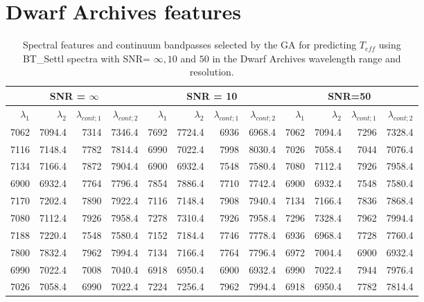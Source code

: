 \section{Dwarf Archives features}
\label{app:features:ipac}


\begin{table*}
\begin{center}
\begin{tabular}{rrrr | rrrr | rrrr }
  \hline
 \multicolumn{4}{c}{SNR = $\infty $} &  \multicolumn{4}{c}{SNR = 10} &  \multicolumn{4}{c}{SNR=50} \\
  \hline
$\lambda_1$ & $\lambda_2$ & $\lambda_{cont;1}$ & $\lambda_{cont;2} $ & $\lambda_1$ & $\lambda_2$ & $\lambda_{cont;1}$ & $\lambda_{cont;2} $ & $\lambda_1$ & $\lambda_2$ & $\lambda_{cont;1}$ & $\lambda_{cont;2} $ \\ 
  \hline
7062 & 7094.4 &	7314 & 7346.4 & 7692 & 7724.4 &	6936 & 6968.4  & 7062 & 7094.4 &  7296 & 7328.4 \\
7116 & 7148.4 &	7782 & 7814.4 & 6990 & 7022.4 &	7998 & 8030.4  & 7026 & 7058.4 &  7044 & 7076.4 \\
7134 & 7166.4 &	7872 & 7904.4 & 6900 & 6932.4 &	7548 & 7580.4  & 7080 & 7112.4 &  7926 & 7958.4 \\
6900 & 6932.4 &	7764 & 7796.4 & 7854 & 7886.4 &	7710 & 7742.4  & 6900 & 6932.4 &  7548 & 7580.4 \\
7170 & 7202.4 &	7890 & 7922.4 & 7116 & 7148.4 &	7908 & 7940.4  & 7134 & 7166.4 &  7836 & 7868.4 \\
7080 & 7112.4 &	7926 & 7958.4 & 7278 & 7310.4 &	7926 & 7958.4  & 7296 & 7328.4 &  7962 & 7994.4 \\
7188 & 7220.4 &	7548 & 7580.4 & 7152 & 7184.4 &	7746 & 7778.4  & 6936 & 6968.4 &  7728 & 7760.4 \\
7800 & 7832.4 &	7962 & 7994.4 & 7134 & 7166.4 &	7764 & 7796.4  & 6972 & 7004.4 &  6900 & 6932.4 \\
6990 & 7022.4 &	7008 & 7040.4 & 6918 & 6950.4 &	6900 & 6932.4  & 6990 & 7022.4 &  7944 & 7976.4 \\
7026 & 7058.4 &	6990 & 7022.4 & 7224 & 7256.4 &	7962 & 7994.4  & 6918 & 6950.4 &  7782 & 7814.4 \\

\hline
\end{tabular}
\caption {Spectral features and continuum bandpasses selected by the
  GA for predicting $ T_{eff}$ using BT\_Settl spectra with SNR= $\infty ,10 $ and
  $ 50 $ in the Dwarf Archives wavelength range and
  resolution.} \label{tab:ipac-teff-noisy}
\end{center}
\end{table*}


